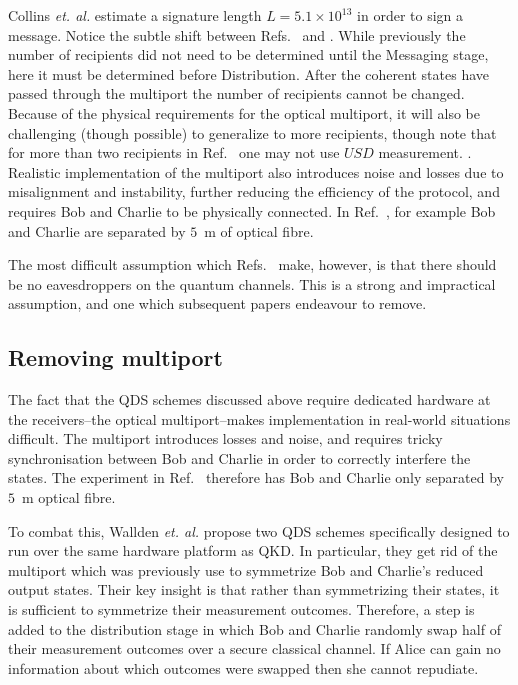 Collins \emph{et. al.} estimate a signature length $L = 5.1 \times 10^{13}$ in order to sign a message. Notice the subtle shift between Refs.~\cite{Gottesman2001} and \cite{Andersson2006, Clarke2012, Dunjko2014, Collins2014}. While previously the number of recipients did not need to be determined until the Messaging stage, here it must be determined before Distribution. After the coherent states have passed through the multiport the number of recipients cannot be changed. 
 Because of the physical requirements for the optical multiport, it will also be challenging (though possible) to generalize to more recipients, though note that for more than two recipients in Ref.~\cite{Dunjko2014} one may not use $USD$ measurement. . Realistic implementation of the multiport also introduces noise and losses due to misalignment and instability, further reducing the efficiency of the protocol, and requires Bob and Charlie to be physically connected. In Ref.~\cite{Clarke2012, Collins2014}, for example Bob and Charlie are separated by $5$~m of optical fibre. 

The most difficult assumption which Refs.~\cite{Clarke2012, Dunjko2014, Collins2014} make, however, is that there should be no eavesdroppers on the quantum channels. This is a strong and impractical assumption, and one which subsequent papers endeavour to remove.


\subsection*{Removing multiport}

The fact that the QDS schemes discussed above require dedicated hardware at the receivers--the optical multiport--makes implementation in real-world situations difficult. The multiport introduces losses and noise, and requires tricky synchronisation between Bob and Charlie in order to correctly interfere the states. The experiment in Ref.~\cite{Collins2014} therefore has Bob and Charlie only separated by $5$~m optical fibre. 

To combat this, Wallden \emph{et. al.} \cite{Wallden2015} propose two QDS schemes specifically designed to run over the same hardware platform as QKD. In particular, they get rid of the multiport which was previously use to symmetrize Bob and Charlie's reduced output states. Their key insight is that rather than symmetrizing their states, it is sufficient to symmetrize their measurement outcomes. Therefore, a step is added to the distribution stage in which Bob and Charlie randomly swap half of their measurement outcomes over a secure classical channel. If Alice can gain no information about which outcomes were swapped then she cannot repudiate. 

